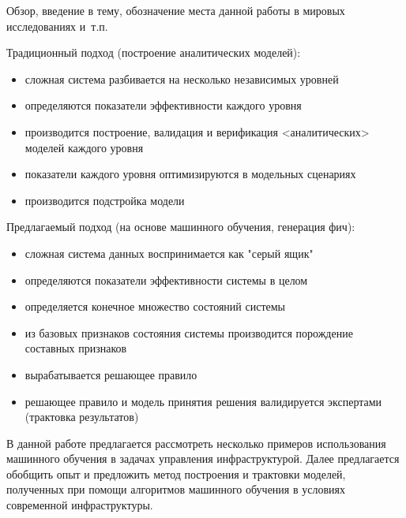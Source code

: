 
{\actuality} Обзор, введение в тему, обозначение места данной работы в
мировых исследованиях и~т.\:п.

Традиционный подход (построение аналитических моделей):
\begin{itemize}
\item  сложная система разбивается на несколько независимых уровней
\item  определяются показатели эффективности каждого уровня
\item  производится построение, валидация и верификация <аналитических> моделей каждого уровня
\item  показатели каждого уровня оптимизируются в модельных сценариях
\item  производится подстройка модели
\end{itemize}


Предлагаемый подход (на основе машинного обучения, генерация фич):
\begin{itemize}
\item  сложная система данных воспринимается как "серый ящик"
\item  определяются показатели эффективности системы в целом 
\item  определяется конечное множество состояний системы
\item  из базовых признаков состояния системы производится порождение составных признаков 
\item  вырабатывается решающее правило
\item  решающее правило и модель принятия решения валидируется экспертами (трактовка результатов)
\end{itemize}

В данной работе предлагается рассмотреть несколько примеров использования машинного обучения в задачах управления инфраструктурой. Далее предлагается обобщить опыт и предложить метод построения и трактовки моделей, полученных при помощи алгоритмов машинного обучения в условиях современной инфраструктуры.






